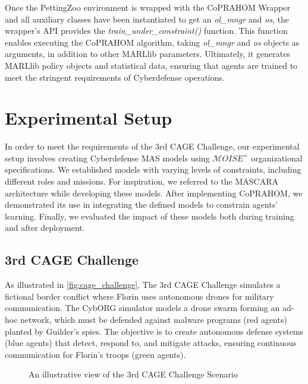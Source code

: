 Once the PettingZoo environment is wrapped with the CoPRAHOM Wrapper and all auxiliary classes have been instantiated to get an \textit{ol\_mngr} and \textit{os}, the wrapper's API provides the \textit{train\_under\_constraint()} function. This function enables executing the CoPRAHOM algorithm, taking \textit{ol\_mngr} and \textit{os} objects as arguments, in addition to other MARLlib parameters. Ultimately, it generates MARLlib policy objects and statistical data, ensuring that agents are trained to meet the stringent requirements of Cyberdefense operations.

\section{Experimental Setup}\label{sec:experimental_setup}

In order to meet the requirements of the 3rd CAGE Challenge, our experimental setup involves creating Cyberdefense MAS models using $\mathcal{M}OISE^+$ organizational specifications. We established models with varying levels of constraints, including different roles and missions. For inspiration, we referred to the MASCARA architecture while developing these models. After implementing CoPRAHOM, we demonstrated its use in integrating the defined models to constrain agents' learning. Finally, we evaluated the impact of these models both during training and after deployment.

\subsection{3rd CAGE Challenge}

As illustrated in \autoref{fig:cage_challenge},
The 3rd CAGE Challenge simulates a fictional border conflict where Florin uses autonomous drones for military communication. The CybORG simulator models a drone swarm forming an ad-hoc network, which must be defended against malware programs (red agents) planted by Guilder's spies. The objective is to create autonomous defense systems (blue agents) that detect, respond to, and mitigate attacks, ensuring continuous communication for Florin's troops (green agents).

\begin{figure}
  \centering
  
  \caption{An illustrative view of the 3rd CAGE Challenge Scenario}\label{fig:cage_challenge}
\end{figure}

